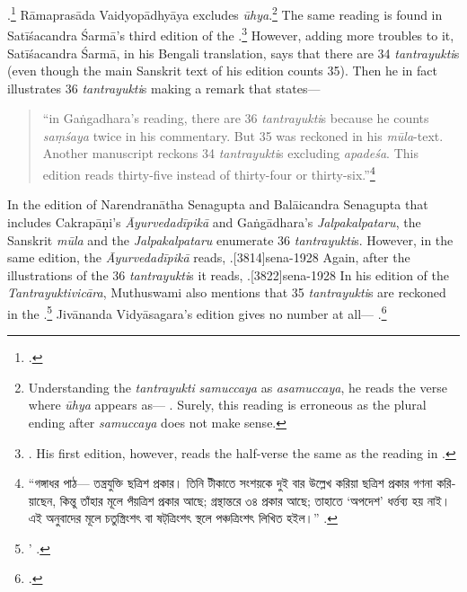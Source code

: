 .\footnote{\cite[1913]{vaid-1911}.} 
Rāmaprasāda Vaidyopādhyāya excludes \emph{ūhya}.\footnote{Understanding the \emph{tantrayukti} \emph{samuccaya} as \emph{asamuccaya}, he reads the verse where \emph{ūhya} appears as--- 
	. Surely, this reading is erroneous as the plural ending after \emph{samuccaya} does not make sense.} 
The same reading is found in Satīśacandra Śarmā's third edition of the 
\CS.\footnote{\cite[1020]{sarm-1923}. His first edition, however, reads the 
half-verse the same as the reading in \cite{cara-trikamji}.\parencite[884]{sarm-1904}}
However, adding more troubles to it, Satīśacandra Śarmā, in his Bengali translation, 
says that there are 34 \emph{tantrayukti}s (even though the main Sanskrit text of 
his edition counts 35). Then he in fact illustrates 36 \emph{tantrayukti}s making a 
remark that states---

\begin{quote}
	
 “in Gaṅgadhara's reading, there are 36 \emph{tantrayukti}s because he 
counts \emph{saṃśaya} twice in his commentary. But 35 was reckoned in his 
\emph{mūla}-text. Another manuscript reckons 34 \emph{tantrayukti}s excluding 
\emph{apadeśa}. This edition reads thirty-five instead of thirty-four or 
thirty-six.”\footnote{\textbengali{“গঙ্গাধর পাঠ— তন্ত্রযুক্তি ছত্রিশ প্রকার। তিনি টীকাতে সংশয়কে 
দুই বার উল্লেখ করিয়া ছত্রিশ প্রকার গণনা করিয়াছেন, কিন্তু তাঁহার মূলে পঁয়ত্রিশ প্রকার আছে; গ্রন্থান্তরে ৩৪ 
প্রকার আছে; তাহাতে ‘অপদেশ’ ধর্ত্তব্য হয় নাই। এই অনুবাদের মূলে চতুস্ত্রিংশৎ বা ষট্‌ত্রিংশৎ স্থলে 
পঞ্চত্রিংশৎ লিখিত হইল।”} \cite[1022]{sarm-1923}.}
	
\end{quote}
 
In the edition of Narendranātha Senagupta and Balāicandra Senagupta that includes 
Cakrapāṇi's \emph{Āyurvedadīpikā} and Gaṅgādhara's \emph{Jalpakalpataru}, the 
Sanskrit \emph{mūla} and the \emph{Jalpakalpataru} enumerate 36 
\emph{tantrayukti}s. However, in the same edition, the \emph{Āyurvedadīpikā} 
reads, .[3814]{sena-1928} 
Again, after the illustrations of the 36 \emph{tantrayukti}s it reads, .[3822]{sena-1928} 
In his edition of the \emph{Tantrayuktivicāra}, Muthuswami also mentions that 35 \emph{tantrayukti}s are reckoned in the \CS.\footnote{’ \parencite[fn.2][2]{muth-1976}.} 
Jivānanda Vidyāsagara's edition gives no number at all--- .\footcite[961]{bhat-1877} 

